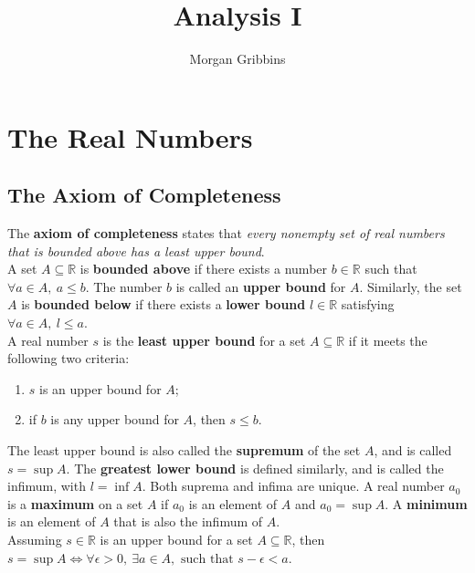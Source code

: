 \documentclass[12pt,letterpaper]{article}
\title{Analysis I}
\author{Morgan Gribbins}
\date{}
\begin{document}
	
\maketitle
\tableofcontents
\pagebreak

\section{The Real Numbers}

\subsection{The Axiom of Completeness}

The \textbf{axiom of completeness} states that \textit{every nonempty set of real numbers that is bounded above has a least upper bound}. \\

A set \(A \subseteq \mathbb{R}\) is \textbf{bounded above} if there exists a number \(b \in \mathbb{R}\) such that \(\forall a \in A,\ a \leq b\). The number \(b\) is called an \textbf{upper bound} for \(A\). Similarly, the set \(A\) is \textbf{bounded below} if there exists a \textbf{lower bound} \(l \in \mathbb{R}\) satisfying \(\forall a \in A,\ l \leq a\). \\

A real number \(s\) is the \textbf{least upper bound} for a set \(A \subseteq \mathbb{R}\) if it meets the following two criteria:

\begin{enumerate}
	\item \(s\) is an upper bound for \(A\);
	\item if \(b\) is any upper bound for \(A\), then \(s \leq b\).
\end{enumerate}

The least upper bound is also called the \textbf{supremum} of the set \(A\), and is called \(s = \sup A\). The \textbf{greatest lower bound} is defined similarly, and is called the infimum, with \(l = \inf A\). Both suprema and infima are unique. A real number \(a_{0}\) is a \textbf{maximum} on a set \(A\) if \(a_{0}\) is an element of \(A\) and \(a_{0} = \sup A\). A \textbf{minimum}  is an element of \(A\) that is also the infimum of \(A\).  \\

Assuming \(s \in \mathbb{R}\) is an upper bound for a set \(A \subseteq \mathbb{R}\), then \(s = \sup A \iff \forall \epsilon > 0,\ \exists a \in A, \text{ such that } s-\epsilon < a\).
\end{document}
